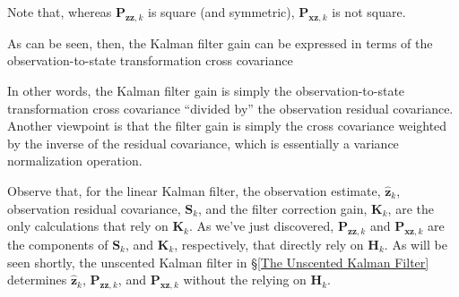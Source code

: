 
Note that, whereas $\mathbf{P}_{\mathbf{zz},k}$ is square (and symmetric),
$\mathbf{P}_{\mathbf{xz},k}$ is not square.

As can be seen, then, the Kalman filter gain can be expressed in terms of the
observation-to-state transformation cross covariance


In other words, the Kalman filter gain is simply the observation-to-state transformation
cross covariance “divided by” the observation residual covariance. Another viewpoint is
that the filter gain is simply the cross covariance weighted by the inverse of the residual
covariance, which is essentially a variance normalization operation.

Observe that, for the linear Kalman filter, the observation estimate, $\hat{\mathbf{z}}_k$,
observation residual covariance, $\mathbf{S}_k$, and the filter correction gain, $\mathbf{K}_k$,
are the only calculations that rely on $\mathbf{K}_k$. As we’ve just discovered,
$\mathbf{P}_{\mathbf{zz},k}$ and $\mathbf{P}_{\mathbf{xz},k}$ are the components of $\mathbf{S}_k$,
and $\mathbf{K}_k$, respectively, that directly rely on $\mathbf{H}_k$. As will be seen shortly,
the unscented Kalman filter in \S\ref{The Unscented Kalman Filter} determines
$\hat{\mathbf{z}}_k$, $\mathbf{P}_{\mathbf{zz},k}$, and $\mathbf{P}_{\mathbf{xz},k}$
without the relying on $\mathbf{H}_k$.
